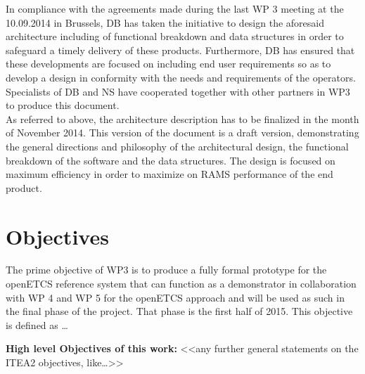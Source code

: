 In compliance with the agreements made during the last WP 3 meeting at the 10.09.2014 in Brussels, DB has taken the initiative to design the aforesaid architecture including of functional breakdown and data structures in order to safeguard a timely delivery of these products. Furthermore, DB has ensured that these developments are focused on including end user requirements so as to develop a design in conformity with the needs and requirements of the operators. Specialists of DB and NS have cooperated together with other partners in WP3 to produce this document.\\

As referred to above, the architecture description has to be finalized in the month of November 2014. This version of the document is a draft version, demonstrating the general directions and philosophy of the architectural design, the functional breakdown of the software and the data structures. The design is focused on maximum efficiency in order to maximize on RAMS performance of the end product.\\


\section{Objectives}
The prime objective of WP3 is to produce a fully formal prototype for the openETCS reference system that can function as a demonstrator in collaboration with WP 4 and WP 5  for the openETCS approach and will be used as such in the final phase of the project. That phase is the first half of 2015.  This objective is defined as … 

\textbf{High level Objectives of this work:}
<<any further general statements on the ITEA2  objectives, like…>>\\

